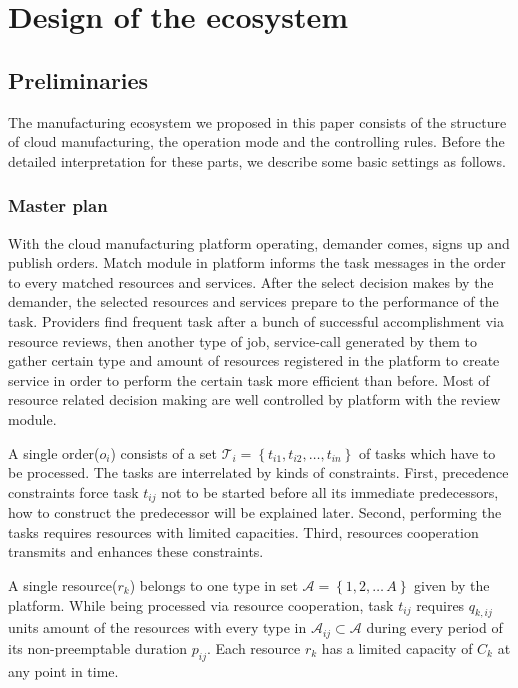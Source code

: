 \section{Design of the ecosystem} %
\label{sec:design_of_the_ecosystem}
\subsection{Preliminaries} %
\label{sub:preliminaries}
The manufacturing ecosystem we proposed in this paper consists of the structure of cloud manufacturing, the operation mode and the controlling rules. Before the detailed interpretation for these parts, we describe some basic settings as follows.

\subsubsection{Master plan} %
\label{ssub:master_plam}
With the cloud manufacturing platform operating, demander comes, signs up and publish orders. Match module in platform informs the task messages in the order to every matched resources and services. After the select decision makes by the demander, the selected resources and services prepare to the performance of the task. 
Providers find frequent task after a bunch of successful accomplishment via resource reviews, then another type of job, service-call generated by them to gather certain type and amount of resources registered in the platform to create service in order to perform the certain task more efficient than before. Most of resource related decision making are well controlled by platform with the review module.

A single order($o_i$) consists of a set $\mathcal{T}_i = \left\{ t_{i1},t_{i2},\dots,t_{in}\right\}$ of tasks which have to be processed. The tasks are interrelated by kinds of constraints. First, precedence constraints force task $t_{ij}$ not to be started before all its immediate predecessors, how to construct the predecessor will be explained later. Second, performing the tasks requires resources with limited capacities. Third, resources cooperation transmits and enhances these constraints.

A single resource($r_k$) belongs to one type in set $\mathcal{A} = \left\{1,2,\dots\,A\right\}$ given by the platform. While being processed via resource cooperation, task $t_{ij}$ requires $q_{k,ij}$ units amount of the resources with every type in $\mathcal{A}_{ij}\subset\mathcal{A}$ during every period of its non-preemptable duration $p_{ij}$. Each resource $r_k$ has a limited capacity of $C_k$ at any point in time.

